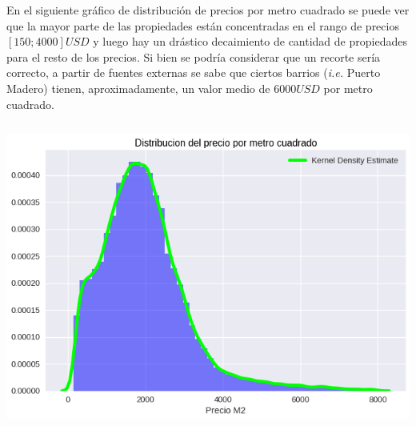 \documentclass[a4paper, 10pt]{article}
\newcommand\tab[1][0.5cm]{\hspace*{#1}}
\begin{document}
				\tab En el siguiente gráfico de distribución de precios por metro cuadrado se puede ver que la mayor parte
				de las propiedades están concentradas en el rango de precios $[150;4000]USD$ y luego hay un drástico decaimiento
				de cantidad de propiedades para el resto de los precios. Si bien se podría considerar que un recorte sería
				correcto, a partir de fuentes externas se sabe que ciertos barrios (\emph{i.e.} Puerto Madero) tienen,
				aproximadamente, un valor medio de $6000USD$ por metro cuadrado.
				\begin{center}
       				\includegraphics[width=6in, height=4in]{images/m2Histogram}
		   		\end{center}
\end{document}
